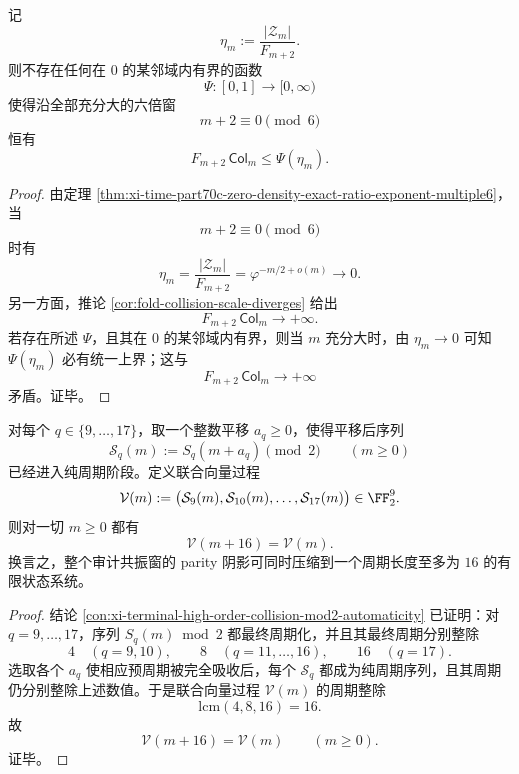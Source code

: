 \begin{theorem}[六倍窗零点相对密度对碰撞尺度不存在有界闭包]\label{thm:xi-time-part9zj-zero-density-no-bounded-closure-collision-scale}
记
\[
\eta_m:=\frac{|\mathcal Z_m|}{F_{m+2}}.
\]
则不存在任何在 \(0\) 的某邻域内有界的函数
\[
\Psi:[0,1]\to [0,\infty)
\]
使得沿全部充分大的六倍窗
\[
m+2\equiv 0\pmod 6
\]
恒有
\[
F_{m+2}\,\mathsf{Col}_m\le \Psi(\eta_m).
\]
\end{theorem}
\begin{proof}
由定理 \ref{thm:xi-time-part70c-zero-density-exact-ratio-exponent-multiple6}，当
\[
m+2\equiv 0\pmod 6
\]
时有
\[
\eta_m=\frac{|\mathcal Z_m|}{F_{m+2}}
=
\varphi^{-m/2+o(m)}
\longrightarrow 0.
\]
另一方面，推论 \ref{cor:fold-collision-scale-diverges} 给出
\[
F_{m+2}\,\mathsf{Col}_m\longrightarrow +\infty.
\]
若存在所述 \(\Psi\)，且其在 \(0\) 的某邻域内有界，则当 \(m\) 充分大时，由 \(\eta_m\to 0\) 可知 \(\Psi(\eta_m)\) 必有统一上界；这与
\[
F_{m+2}\,\mathsf{Col}_m\to +\infty
\]
矛盾。证毕。
\end{proof}

\begin{theorem}\label{thm:xi-time-part9zj-resonance-window-mod2-joint-period16-collapse}
对每个 \(q\in\{9,\dots,17\}\)，取一个整数平移 \(a_q\ge 0\)，使得平移后序列
\[
\mathcal S_q(m):=S_q(m+a_q)\pmod 2
\qquad (m\ge 0)
\]
已经进入纯周期阶段。定义联合向量过程
\[
\mathcal V(m):=
\bigl(
\mathcal S_9(m),\mathcal S_{10}(m),\dots,\mathcal S_{17}(m)
\bigr)\in \FF_2^9.
\]
则对一切 \(m\ge 0\) 都有
\[
\mathcal V(m+16)=\mathcal V(m).
\]
换言之，整个审计共振窗的 parity 阴影可同时压缩到一个周期长度至多为 \(16\) 的有限状态系统。
\end{theorem}
\begin{proof}
结论 \ref{con:xi-terminal-high-order-collision-mod2-automaticity} 已证明：对 \(q=9,\dots,17\)，序列 \(S_q(m)\bmod 2\) 都最终周期化，并且其最终周期分别整除
\[
4\quad (q=9,10),\qquad
8\quad (q=11,\dots,16),\qquad
16\quad (q=17).
\]
选取各个 \(a_q\) 使相应预周期被完全吸收后，每个 \(\mathcal S_q\) 都成为纯周期序列，且其周期仍分别整除上述数值。于是联合向量过程 \(\mathcal V(m)\) 的周期整除
\[
\mathrm{lcm}(4,8,16)=16.
\]
故
\[
\mathcal V(m+16)=\mathcal V(m)
\qquad (m\ge 0).
\]
证毕。
\end{proof}

